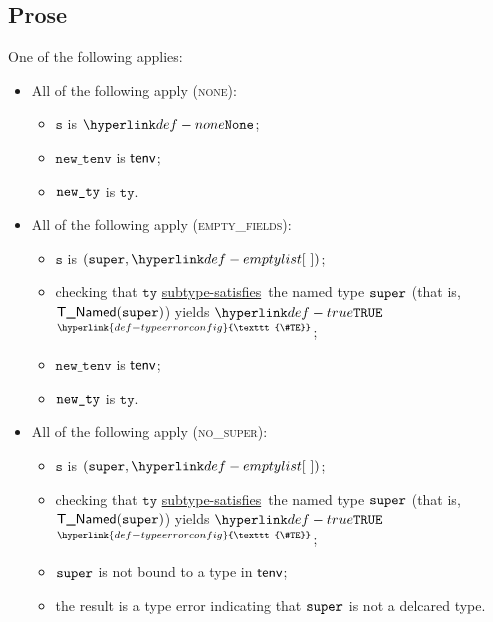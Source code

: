 \documentclass{book}
\newcommand\TypeErrorConfig[0]{\hyperlink{def-typeerrorconfig}{\texttt{\#TE}}}
\newcommand\ProseOrTypeError[0]{\hyperlink{def-proseortypeerror}{$^{\TypeErrorConfig}$}}
\newcommand\subtypesatisfies[0]{\hyperlink{def-subtypesatisfies}{subtype-satisfies}}
\newcommand\newtenv[0]{\texttt{new\_tenv}}
\newcommand\vs[0]{\texttt{s}}
\newcommand\tty[0]{\texttt{ty}}
\begin{document}
\subsection{Prose}
One of the following applies:
\begin{itemize}
  \item All of the following apply (\textsc{none}):
  \begin{itemize}
    \item $\vs$ is $\None$;
    \item $\newtenv$ is $\textsf{tenv}$;
    \item $\texttt{new\_ty}$ is $\tty$.
  \end{itemize}

  \item All of the following apply (\textsc{empty\_fields}):
  \begin{itemize}
    \item $\vs$ is $(\vsuper, \emptylist)$;
    \item checking that $\tty$ \subtypesatisfies\ the named type $\texttt{super}$ (that is, \\ $\textsf{T\_Named}(\texttt{super})$) yields
          $\True$ \ProseOrTypeError;
    \item $\newtenv$ is $\textsf{tenv}$;
    \item $\texttt{new\_ty}$ is $\tty$.
  \end{itemize}

  \item All of the following apply (\textsc{no\_super}):
  \begin{itemize}
    \item $\vs$ is $(\vsuper, \emptylist)$;
    \item checking that $\tty$ \subtypesatisfies\ the named type $\texttt{super}$ (that is, \\ $\textsf{T\_Named}(\texttt{super})$) yields
          $\True$ \ProseOrTypeError;
    \item $\texttt{super}$ is not bound to a type in $\textsf{tenv}$;
    \item the result is a type error indicating that $\texttt{super}$ is not a delcared type.
  \end{itemize}


\end{itemize}
\end{document}
